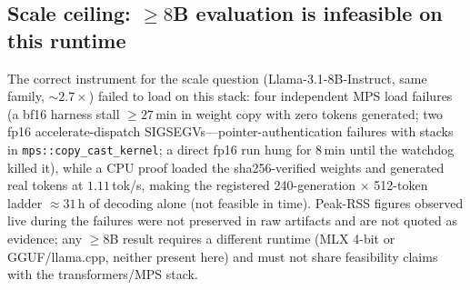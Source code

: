 \documentclass[sigconf,nonacm]{acmart}
\begin{document}
\subsection{Scale ceiling: ${\ge}8$B evaluation is infeasible on this
runtime}
The correct instrument for the scale question (Llama-3.1-8B-Instruct,
same family, ${\sim}2.7\times$) failed to load on this stack: four
independent MPS load failures (a bf16 harness stall ${\ge}27$\,min in
weight copy with zero tokens generated; two fp16
accelerate-dispatch SIGSEGVs---pointer-authentication failures with
stacks in \texttt{mps::copy\_cast\_kernel}; a direct fp16 run hung for
8\,min until the watchdog killed it), while a CPU proof loaded the
sha256-verified weights and generated real tokens at $1.11$\,tok/s,
making the registered 240-generation $\times$ 512-token ladder
${\approx}31$\,h of decoding alone (not feasible in time). Peak-RSS
figures observed live during the failures were not preserved in raw
artifacts and are not quoted as evidence; any ${\ge}8$B result requires a
different runtime (MLX 4-bit or GGUF/llama.cpp, neither present here) and
must not share feasibility claims with the transformers/MPS stack.
\end{document}

